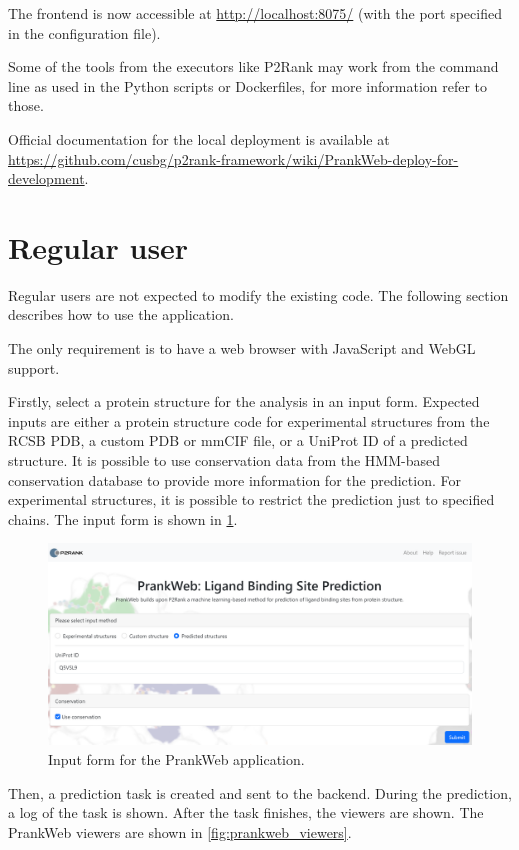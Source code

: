 The frontend is now accessible at \url{http://localhost:8075/} (with the port specified in the configuration file).

Some of the tools from the executors like P2Rank may work from the command line as used in the Python scripts or Dockerfiles, for more information refer to those.

Official documentation for the local deployment is available at \url{https://github.com/cusbg/p2rank-framework/wiki/PrankWeb-deploy-for-development}.


\section{Regular user}
\label{sec:regular_user}

Regular users are not expected to modify the existing code. The following section describes how to use the application.

The only requirement is to have a web browser with JavaScript and WebGL support.

Firstly, select a protein structure for the analysis in an input form. Expected inputs are either a protein structure code for experimental structures from the RCSB PDB, a custom PDB or mmCIF file, or a UniProt ID of a predicted structure. It is possible to use conservation data from the HMM-based conservation database to provide more information for the prediction. For experimental structures, it is possible to restrict the prediction just to specified chains. The input form is shown in \cref{fig:input_form}.

\begin{figure}[ht]
    \centering
    \includegraphics[width=\textwidth]{img/pw_introsite.png}
    \caption{Input form for the PrankWeb application.}
    \label{fig:input_form}
\end{figure}

Then, a prediction task is created and sent to the backend. During the prediction, a log of the task is shown. After the task finishes, the viewers are shown. The PrankWeb viewers are shown in \cref{fig:prankweb_viewers}.

